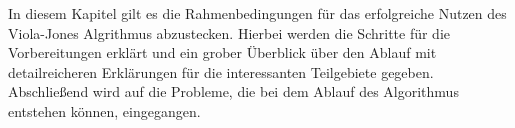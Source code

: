 In diesem Kapitel gilt es die Rahmenbedingungen für das erfolgreiche Nutzen des Viola-Jones Algrithmus abzustecken. Hierbei werden die Schritte für die Vorbereitungen erklärt und ein grober Überblick über den Ablauf mit detailreicheren Erklärungen für die interessanten Teilgebiete gegeben. Abschließend wird auf die Probleme, die bei dem Ablauf des Algorithmus entstehen können, eingegangen.